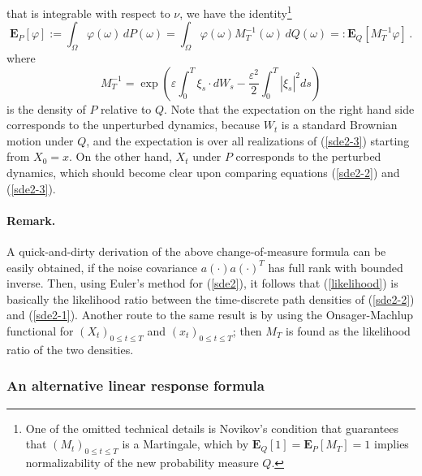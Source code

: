 \documentclass[]{tMPH2e}
\newcommand{\eps}{\varepsilon}
\newcommand{\bE}{{\mathbf E}}
\newcommand{\wrt}{with respect to }
\begin{document}
that is integrable \wrt $\nu$, we have the identity\footnote{One of the omitted technical details is Novikov's condition \cite[pp.~162]{oksendal2003stochastic} that guarantees that $(M_{t})_{0\le t\le T}$ is a Martingale, which by $\bE_{Q}[1]=\bE_{P}[M_{T}]=1$ implies normalizability of the new probability measure $Q$.}
\[
\bE_{P}[\varphi] := \int_{\Omega} \varphi(\omega)\, dP(\omega) = \int_{\Omega} \varphi(\omega) M_{T}^{-1}(\omega)\,dQ(\omega) =: \bE_{Q}[M^{-1}_{T}\varphi]\,.
\]
where 
\[
M_{T}^{-1} = \exp\left(\eps\int_{0}^{T}\xi_{s}\cdot dW_{s} - \frac{\eps^{2}}{2}\int_{0}^{T}|\xi_{s}|^{2}ds\right)
\]
is the density of $P$ relative to $Q$. Note that the expectation on the right hand side corresponds to the unperturbed dynamics, because $W_{t}$ is a standard Brownian motion under $Q$, and the expectation is over all realizations of (\ref{sde2-3}) starting from $X_{0}=x$. On the other hand, $X_{t}$ under $P$ corresponds to the perturbed dynamics, which should become clear upon comparing equations (\ref{sde2-2}) and (\ref{sde2-3}). 


\paragraph*{Remark.} 

A quick-and-dirty derivation of the above change-of-measure formula can be easily obtained, if the noise covariance $a(\cdot)a(\cdot)^{T}$ has full rank with bounded inverse. Then, using Euler's method for (\ref{sde2}), it follows that (\ref{likelihood}) is basically the likelihood ratio between the time-discrete path densities of (\ref{sde2-2}) and (\ref{sde2-1}).  Another route to the same result is by using the Onsager-Machlup functional \cite{Pinski1} for $(X_t)_{0\le t\le T}$ and $(x_t)_{0\le t\le T}$; then $M_{T}$ is found as the likelihood ratio of the two densities. 






\subsubsection*{An alternative linear response formula}
\end{document}
